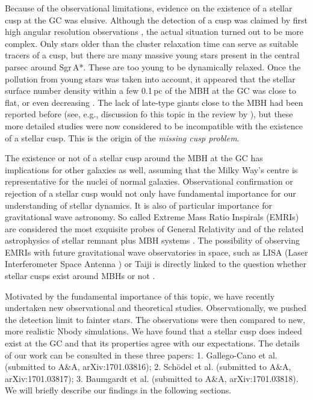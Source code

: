 \documentclass[a4paper]{jpconf}
\begin{document}
Because of the observational limitations, evidence on the existence of
a stellar cusp at the GC was elusive. Although the detection of a cusp
was claimed by first high angular resolution observations
\cite{Schodel:2007tw,Genzel:2003it}, the actual situation turned out
to be more complex. Only stars older than the cluster relaxation time
can serve as suitable tracers of a cusp, but there are many massive
young stars present in the central parsec around Sgr\,A*. These are
too young to be dynamically relaxed. Once the pollution from young
stars was taken into account, it appeared that the stellar surface
number density within a few 0.1\,pc of the MBH at the GC was close to
flat, or even decreasing
\cite{Buchholz:2009fk,Do:2009tg,Bartko:2010fk}. The lack of late-type
giants close to the MBH had been reported before (see, e.g.,
discussion fo this topic in the review by \cite{Genzel:2010fk}), but
these more detailed studies were now considered to be incompatible
with the existence of a stellar cusp. This is the origin of the {\it
  missing cusp problem}.

The existence or not of a stellar cusp around the MBH at the GC has
implications for other galaxies as well, assuming that the Milky
Way's centre is representative for the nuclei of normal galaxies. Observational
confirmation or rejection of a stellar cusp would not only have
fundamental importance for our understanding of stellar
dynamics. It is also of particular importance for gravitational wave
astronomy. So called Extreme Mass Ratio Inspirals (EMRIs) are
considered the most exquisite probes of General Relativity and of the
related astrophysics of stellar remnant plus MBH systems
\cite{Amaro-Seoane:2007ve}. The possibility of observing EMRIs with
future gravitational wave observatories in space, such as LISA (Laser Interferometer Space Antenna )
\cite{Amaro-Seoane:2012ys,Amaro-Seoane:2013zr} or Taiji
\cite{Gong:2015zr} is directly linked to the question whether stellar
cusps exist around MBHs or not
\cite{Hopman:2005dn,Amaro-Seoane:2011qv}.

Motivated by the fundamental importance of this topic, we have
recently undertaken new observational and theoretical
studies. Observationally, we pushed the detection limit to fainter
stars. The observations were then compared to new, more realistic
Nbody simulations. We have found that a stellar cusp does indeed exist
at the GC and that its properties agree with our expectations. The
details of our work can be consulted in these three papers:
1. Gallego-Cano et al. (submitted to A\&A, arXiv:1701.03816);
2. Sch{\"o}del et al.  (submitted to A\&A, arXiv:1701.03817);
3. Baumgardt et al.  (submitted to A\&A, arXiv:1701.03818).  We
will briefly describe our findings in the following sections.
\end{document}

